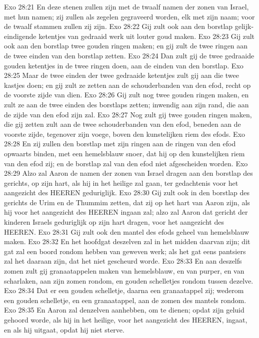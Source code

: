 Exo 28:21  En deze stenen zullen zijn met de twaalf namen der zonen van Israel, met hun namen; zij zullen als zegelen gegraveerd worden, elk met zijn naam; voor de twaalf stammen zullen zij zijn.
Exo 28:22  Gij zult ook aan den borstlap gelijk-eindigende ketentjes van gedraaid werk uit louter goud maken.
Exo 28:23  Gij zult ook aan den borstlap twee gouden ringen maken; en gij zult de twee ringen aan de twee einden van den borstlap zetten.
Exo 28:24  Dan zult gij de twee gedraaide gouden ketentjes in de twee ringen doen, aan de einden van den borstlap.
Exo 28:25  Maar de twee einden der twee gedraaide ketentjes zult gij aan die twee kastjes doen; en gij zult ze zetten aan de schouderbanden van den efod, recht op de voorste zijde van dien.
Exo 28:26  Gij zult nog twee gouden ringen maken, en zult ze aan de twee einden des borstlaps zetten; inwendig aan zijn rand, die aan de zijde van den efod zijn zal.
Exo 28:27  Nog zult gij twee gouden ringen maken, die gij zetten zult aan de twee schouderbanden van den efod, beneden aan de voorste zijde, tegenover zijn voege, boven den kunstelijken riem des efods.
Exo 28:28  En zij zullen den borstlap met zijn ringen aan de ringen van den efod opwaarts binden, met een hemelsblauw snoer, dat hij op den kunstelijken riem van den efod zij; en de borstlap zal van den efod niet afgescheiden worden.
Exo 28:29  Alzo zal Aaron de namen der zonen van Israel dragen aan den borstlap des gerichts, op zijn hart, als hij in het heilige zal gaan, ter gedachtenis voor het aangezicht des HEEREN geduriglijk.
Exo 28:30  Gij zult ook in den borstlap des gerichts de Urim en de Thummim zetten, dat zij op het hart van Aaron zijn, als hij voor het aangezicht des HEEREN ingaan zal; alzo zal Aaron dat gericht der kinderen Israels geduriglijk op zijn hart dragen, voor het aangezicht des HEEREN.
Exo 28:31  Gij zult ook den mantel des efods geheel van hemelsblauw maken.
Exo 28:32  En het hoofdgat deszelven zal in het midden daarvan zijn; dit gat zal een boord rondom hebben van geweven werk; als het gat eens pantsiers zal het daaraan zijn, dat het niet gescheurd worde.
Exo 28:33  En aan deszelfs zomen zult gij granaatappelen maken van hemelsblauw, en van purper, en van scharlaken, aan zijn zomen rondom, en gouden schelletjes rondom tussen dezelve.
Exo 28:34  Dat er een gouden schelletje, daarna een granaatappel zij; wederom een gouden schelletje, en een granaatappel, aan de zomen des mantels rondom.
Exo 28:35  En Aaron zal denzelven aanhebben, om te dienen; opdat zijn geluid gehoord worde, als hij in het heilige, voor het aangezicht des HEEREN, ingaat, en als hij uitgaat, opdat hij niet sterve.
